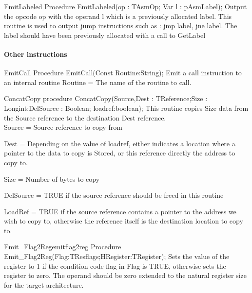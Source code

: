 \documentclass [a4paper,12pt]{article}
\begin{document}
\begin{procedure}{EmitLabeled}
\Declaration
Procedure EmitLabeled(op : TAsmOp; Var l : pAsmLabel);
\Description
Output the opcode \textsf{op} with the operand \textsf{l}
which is a previously allocated label.
\Notes
This routine is used to output jump instructions such as : jmp label, jne
label.  The label should have been previously allocated with a call to
\textsf{GetLabel}
\end{procedure}

\paragraph{Other instructions}

\begin{function}{EmitCall}
\Declaration
Procedure EmitCall(Const Routine:String);
\Description
Emit a call instruction to an internal routine
\Parameters
Routine = The name of the routine to call.
\end{function}

\begin{procedure}{ConcatCopy}
\Declaration
procedure ConcatCopy(Source,Dest : TReference;Size : Longint;DelSource : Boolean; loadref:boolean);
\Description
This routine copies \textsf{Size} data from the \textsf{Source} reference to
the destination \textsf{Dest} reference. \\
\Parameters
Source = Source reference to copy from \par 
Dest = Depending on the value of loadref, either indicates a location where a pointer to the data to copy is
Stored, or this reference directly the address to copy to. \par
Size = Number of bytes to copy \par
DelSource = TRUE if the source reference should be freed in this routine \par
LoadRef = TRUE if the source reference contains a pointer to the address we
	wish to copy to, otherwise the reference itself is the destination
	location to copy to.
\end{procedure}

\begin{procedurel}{Emit{\_}Flag2Reg}{emitflag2reg}
\Declaration
Procedure Emit{\_}Flag2Reg(Flag:TResflags;HRegister:TRegister);
\Description
Sets the value of the register to 1 if the condition code flag in
\textsf{Flag} is TRUE, otherwise sets the register to zero.
\Notes
The operand should be zero extended to the natural register size for the
target architecture.
\end{procedurel}
\end{document}
